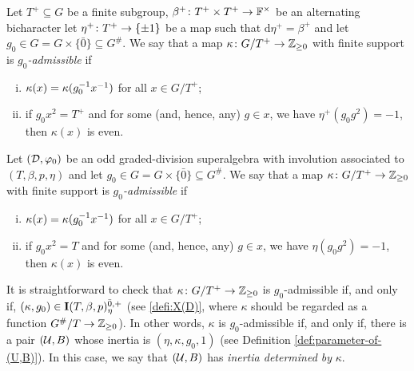 \begin{defi}\label{defi:odd-D-kappa-g_0-admissible}
    Let $T^+ \subseteq G$ be a finite subgroup, $\beta^+\colon T^+\times T^+ \to \mathbb{F}^\times$ be an alternating bicharacter let $\eta^+\colon T^+ \to \{ \pm 1 \}$ be a map such that $\mathrm{d}\eta^+ = \beta^+$ and let $g_0 \in G = G \times \{ \bar 0 \} \subseteq G^\#$. 
    We say that a map $\kappa\colon G/T^+ \to \mathbb{Z}_{\geq 0}$ with finite support is \emph{$g_0$-admissible} if
	\begin{enumerate}[(i)]
		\item $\kappa(x) = \kappa(g_0^{-1} x^{-1})$ for all $x \in G/T^+$;
		\item if $g_0 x^2 = T^+$ and 
		for some (and, hence, any) $g\in x$, we have $\eta^+(g_0g^2) = -1$, then $\kappa (x)$ is even.
	\end{enumerate}

    Let $(\mathcal{D}, \varphi_0)$ be an odd graded-division superalgebra with involution associated to $(T, \beta, p, \eta)$ and let $g_0 \in G = G \times \{ \bar 0 \} \subseteq G^\#$. 
    We say that a map $\kappa\colon G/T^+ \to \mathbb{Z}_{\geq 0}$ with finite support is \emph{$g_0$-admissible} if
	\begin{enumerate}[(i)]
		\item $\kappa(x) = \kappa(g_0^{-1} x^{-1})$ for all $x \in G/T^+$;
		\item if $g_0 x^2 = T$ and 
		for some (and, hence, any) $g\in x$, we have $\eta(g_0g^2) = -1$, then $\kappa (x)$ is even.
	\end{enumerate}
\end{defi}

It is straightforward to check that $\kappa\colon G/T^+ \to \mathbb{Z}_{\geq 0}$ is $g_0$-admissible if, and only if, $(\kappa, g_0) \in \mathbf{I}(T,\beta,p)^{{\bar{0}}, +}_\eta$ (see \cref{defi:X(D)}, where $\kappa$ should be regarded as a function $G^\#/T \to \mathbb{Z}_{\geq 0}$). 
In other words, $\kappa$ is $g_0$-admissible if, and only if, there is a pair $(\mathcal U, B)$ whose inertia is $(\eta, \kappa, g_0, 1)$ (see Definition \ref{def:parameter-of-(U,B)}). 
In this case, we say that $(\mathcal U, B)$ has \emph{inertia determined by} $\kappa$. 


